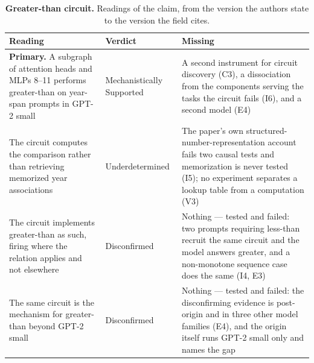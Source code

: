 \clearpage
\begin{table}[H]
\centering
\footnotesize
\caption{\textbf{Greater-than circuit.} Readings of the claim, from the version the authors state to the version the
field cites.}
\label{tab:greater_than-readings}
\renewcommand{\arraystretch}{1.18}
\begin{tabular}{@{}>{\raggedright\arraybackslash}p{3.3cm}l>{\raggedright\arraybackslash}p{4.4cm}@{}}
\toprule
\textbf{Reading} & \textbf{Verdict} & \textbf{Missing} \\
\midrule
\textbf{Primary.} A subgraph of attention heads and MLPs 8--11 performs greater-than on year-span prompts in GPT-2 small
  & Mechanistically Supported
  & A second instrument for circuit discovery (C3), a dissociation from the components serving the tasks the circuit fails (I6), and a second model (E4) \\
\addlinespace[2pt]
The circuit computes the comparison rather than retrieving memorized year associations
  & Underdetermined
  & The paper's own structured-number-representation account fails two causal tests and memorization is never tested (I5); no experiment separates a lookup table from a computation (V3) \\
\addlinespace[2pt]
The circuit implements greater-than as such, firing where the relation applies and not elsewhere
  & Disconfirmed
  & Nothing --- tested and failed: two prompts requiring less-than recruit the same circuit and the model answers greater, and a non-monotone sequence case does the same (I4, E3) \\
\addlinespace[2pt]
The same circuit is the mechanism for greater-than beyond GPT-2 small
  & Disconfirmed
  & Nothing --- tested and failed: the disconfirming evidence is post-origin and in three other model families (E4), and the origin itself runs GPT-2 small only and names the gap \\
\bottomrule
\end{tabular}
\end{table}


